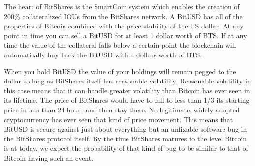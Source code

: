 The heart of BitShares is the SmartCoin system which enables the creation of
200\% collateralized IOUs from the BitShares network. A BitUSD has all of the
properties of Bitcoin combined with the price stability of the US dollar. At
any point in time you can sell a BitUSD for at least 1 dollar worth of BTS. If
at any time the value of the collateral falls below a certain point the
blockchain will automatically buy back the BitUSD with a dollars worth of BTS.

When you hold BitUSD the value of your holdings will remain pegged to the
dollar so long as BitShares itself has reasonable volatility. Reasonable
volatility in this case means that it can handle greater volatility than
Bitcoin has ever seen in its lifetime. The price of BitShares would have to
fall to less than 1/3 its starting price in less than 24 hours and then stay
there. No legitimate, widely adopted cryptocurrency has ever seen that kind
of price movement. This means that BitUSD is secure against just about
everything but an unfixable software bug in the BitShares protocol itself. By
the time BitShares matures to the level Bitcoin is at today, we expect the
probability of that kind of bug to be similar to that of Bitcoin having such an
event.
